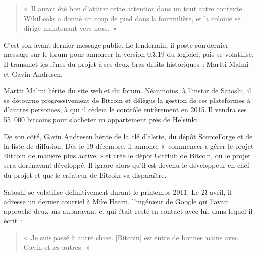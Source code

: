\begin{quote}
«~Il aurait été bon d'attirer cette attention dans un tout autre contexte. WikiLeaks a donné un coup de pied dans la fourmilière, et la colonie se dirige maintenant vers nous.~»
\end{quote}

C'est son avant-dernier message public. Le lendemain, il poste son dernier message sur le forum pour annoncer la version 0.3.19 du logiciel, puis se volatilise. Il transmet les rênes du projet à ses deux bras droits historiques~: Martti Malmi et Gavin Andresen.

Martti Malmi hérite du site web et du forum. Néanmoins, à l'instar de Satoshi, il se détourne progressivement de Bitcoin et délègue la gestion de ces plateformes à d'autres personnes, à qui il cèdera le contrôle entièrement en 2015. Il vendra ses 55~000 bitcoins pour s'acheter un appartement près de Helsinki.

De son côté, Gavin Andresen hérite de la clé d'alerte, du dépôt SourceForge et de la liste de diffusion. Dès le 19 décembre, il annonce «~commencer à gérer le projet Bitcoin de manière plus active~» et crée le dépôt GitHub de Bitcoin, où le projet sera dorénavant développé. Il ignore alors qu'il est devenu le développeur en chef du projet et que le créateur de Bitcoin va disparaître.

Satoshi se volatilise définitivement durant le printemps 2011. Le 23 avril, il adresse un dernier courriel à Mike Hearn, l'ingénieur de Google qui l'avait approché deux ans auparavant et qui était resté en contact avec lui, dans lequel il écrit~:

\begin{quote}
«~Je suis passé à autre chose. [Bitcoin] est entre de bonnes mains avec Gavin et les autres.~» %
\end{quote}

